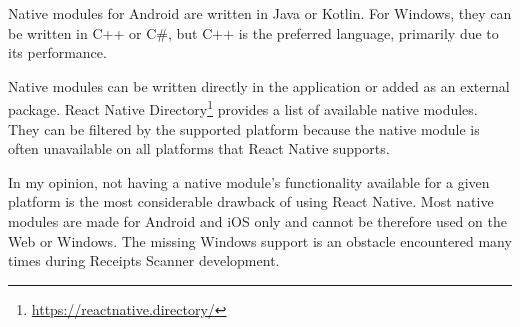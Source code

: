 \documentclass[
  digital, %
  table,   %
  oneside, %
  lof,     %
  lot,     %
]{fithesis3}
\begin{document}
Native modules for Android are written in Java or Kotlin.
For Windows, they can be written in C++ or C\#, but C++ is the preferred language, primarily due to its performance.

Native modules can be written directly in the application or added as an external package. React Native Directory\footnote{\url{https://reactnative.directory/}} provides a list of available native modules. They can be filtered by the supported platform because the native module is often unavailable on all platforms that React Native supports.

In my opinion, not having a native module's functionality available for a given platform is the most considerable drawback of using React Native.
Most native modules are made for Android and iOS only and cannot be therefore used on the Web or Windows. The missing Windows support is an obstacle encountered many times during Receipts Scanner development.
\end{document}
